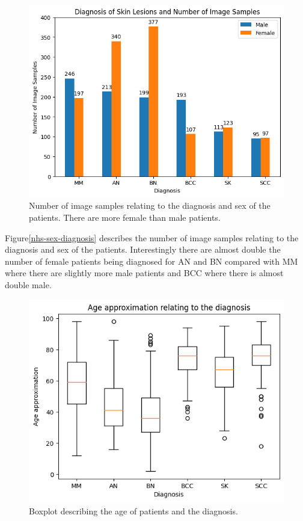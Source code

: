 \begin{figure}
    \centering
    \includegraphics[scale=0.75]{images/nhs/nhs-sex-diagnosis.png}
    \caption{Number of image samples relating to the diagnosis and sex of the patients. There are more female than male patients.} 
\end{figure}\label{nhs-sex-diagnosis}

Figure\ref{nhs-sex-diagnosis} describes the number of image samples relating to the diagnosis and sex of the patients. Interestingly there are almost double the number of female patients being diagnosed for AN and BN compared with MM where there are slightly more male patients and BCC where there is almost double male.

\begin{figure}
    \centering
    \includegraphics[scale=0.75]{images/nhs/nhs-diagnosis-age.png}
    \caption{Boxplot describing the age of patients and the diagnosis.} 
\end{figure}\label{nhs-diagnosis-age}

